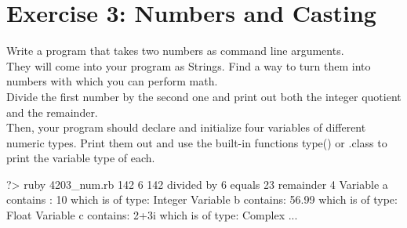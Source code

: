 \documentclass{42-en}
\begin{document}

\nextexercice


\chapter{Exercise 3: Numbers and Casting}

\exnumber{\exercicenumber}
\makeheaderfiles

Write a program that takes two numbers as command line arguments.\\

They will come into your program as Strings. Find a way to turn them into numbers with which you can perform math.\\

Divide the first number by the second one and print out both the integer quotient and the remainder.\\

Then, your program should declare and initialize four variables of different numeric types.
Print them out and use the built-in functions type() or .class to print the variable type of each. 

\begin{42console}
	?> ruby 4203_num.rb 142 6
	142 divided by 6 equals 23 remainder 4
	Variable a contains : 10  which is of type: Integer
	Variable b contains: 56.99  which is of type: Float
	Variable c contains: 2+3i  which is of type: Complex
	...
\end{42console}

\nextexercice

\end{document}
